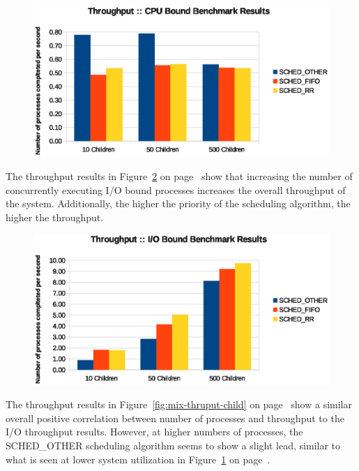 \begin{figure}[H]
  \centering
  \includegraphics[scale=0.8]{img/cpu-thruput-child.eps}
  \caption{}
  \label{fig:cpu-thruput-child}
\end{figure}

The throughput results in Figure~\ref{fig:io-thruput-child} on page~\pageref{fig:io-thruput-child} show that increasing the number of concurrently executing I/O bound processes increases the overall throughput of the system.  Additionally, the higher the priority of the scheduling algorithm, the higher the throughput.

\begin{figure}[H]
  \centering
  \includegraphics[scale=0.8]{img/io-thruput-child.eps}
  \caption{}
  \label{fig:io-thruput-child}
\end{figure}

The throughput results in Figure~\ref{fig:mix-thruput-child} on page~\pageref{fig:mix-thruput-child} show a similar overall positive correlation between number of processes and throughput to the I/O throughput results.  However, at higher numbers of processes, the SCHED\_OTHER scheduling algorithm seems to show a slight lead, similar to what is seen at lower system utilization in Figure~\ref{fig:cpu-thruput-child} on page~\pageref{fig:cpu-thruput-child}.

